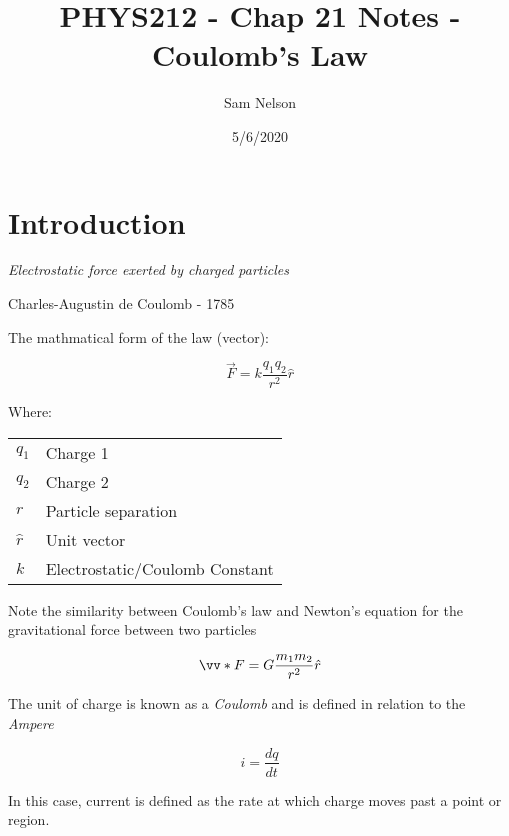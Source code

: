 \documentclass[letterpaper,12pt]{article}
\begin{document}
\pagestyle{plain}

\title{PHYS212 - Chap 21 Notes - Coulomb's Law}
\author{Sam Nelson}
\date{5/6/2020}
\maketitle

\setcounter{tocdepth}{1} %
\tableofcontents

\setlength{\parindent}{0em}
\setlength{\parskip}{1em}
\setlength\arraycolsep{2pt}


\section{Introduction}

\textit{Electrostatic force exerted by charged particles}

Charles-Augustin de Coulomb - 1785

The mathmatical form of the law (vector):

\begin{equation} \label{x1}
	\vec{F} = k\frac{q_1 q_2}{r^2}\hat{r}
\end{equation}

Where:

\begin{tabular}{l|l}
	$q_1$ & Charge 1 \\
	$q_2$ & Charge 2 \\
	$r$ & Particle separation \\
	$\hat{r}$ & Unit vector \\
	$k$ & Electrostatic/Coulomb Constant \\
\end{tabular}

Note the similarity between Coulomb's law and Newton's equation for the gravitational force between two particles

\begin{equation}
	\vv*{F} = G\frac{m_1 m_2}{r^2}\hat{r}
\end{equation}

The unit of charge is known as a \textit{Coulomb} and is defined in relation to the 
\textit{Ampere}

\begin{equation} \label{x2}
	i = \frac{dq}{dt}
\end{equation}

In this case, current is defined as the rate at which charge moves past a point or region.
\end{document}
